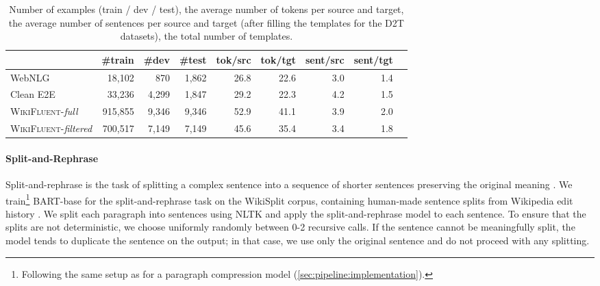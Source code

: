 \begin{table}[t]
    \centering
    \footnotesize
    \begin{tabular}{l rrrrrrrr}\toprule
                                              & \bf  \#train & \bf \#dev & \bf \#test & \bf tok/src & \bf tok/tgt & \bf sent/src & \bf sent/tgt \\  \midrule
        WebNLG                                & 18,102       & 870       & 1,862      & 26.8        & 22.6        & 3.0          & 1.4          \\
        Clean E2E                             & 33,236       & 4,299     & 1,847      & 29.2        & 22.3        & 4.2          & 1.5          \\ \midrule
        \textsc{WikiFluent}-\textit{full}     & 915,855      & 9,346     & 9,346      & 52.9        & 41.1        & 3.9          & 2.0          \\
        \textsc{WikiFluent}-\textit{filtered} & 700,517      & 7,149     & 7,149      & 45.6        & 35.4        & 3.4          & 1.8          \\ \bottomrule
    \end{tabular}
    \caption[Statistics of \textsc{WikiFluent} and data-to-text datasets.]{Number of examples (train / dev / test), the average number of tokens per source and target, the average number of sentences per source and target (after filling the templates for the D2T datasets), the total number of templates.}
    \label{tab:pipeline:wikifluent}
\end{table}

\paragraph{Split-and-Rephrase} Split-and-rephrase is the task of splitting a complex sentence into a sequence of shorter sentences preserving the original meaning \citep{narayan-etal-2017-split}. We train\footnote{Following the same setup as for a paragraph compression model (\autoref{sec:pipeline:implementation}).} BART-base \cite{lewisBARTDenoisingSequencetoSequence2019} for the split-and-rephrase task on the WikiSplit corpus, containing human-made sentence splits from Wikipedia edit history \cite{botha-etal-2018-learning}.  We split each paragraph into sentences using NLTK \cite{bird2006nltk} and apply the split-and-rephrase model to each sentence. To ensure that the splits are not deterministic, we choose uniformly randomly between 0-2 recursive calls. If the sentence cannot be meaningfully split, the model tends to duplicate the sentence on the output; in that case, we use only the original sentence and do not proceed with any splitting.


